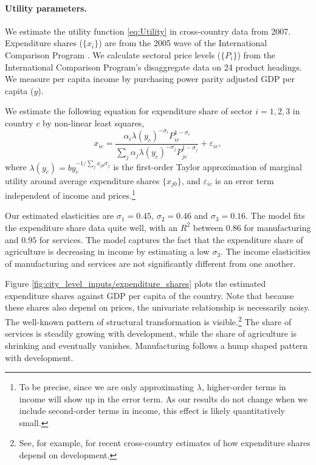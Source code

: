 \documentclass[12pt]{article}
\begin{document}
\paragraph{Utility parameters.}
We estimate the utility function \eqref{eq:Utility} in cross-country data from 2007. Expenditure shares ($\{x_i\}$) are from the 2005 wave of the International Comparison Program \cite{icp}. We calculate sectoral price levels ($\{P_i\}$) from the International Comparison Program's disaggregate data on 24 product headings. We measure per capita income by purchasing power parity adjusted GDP per capita ($y$).

We estimate the following equation for expenditure share of sector $i=1,2,3$ in country $c$ by non-linear least squares,
\begin{equation}\label{eq:estimable:utility}
	x_{ic} =
	\frac 	{\alpha_i \lambda(y_c)^{-\sigma_i}  P_{ic}^{1-\sigma_i}}
			{\sum_j {\alpha_j \lambda(y_c)^{-\sigma_j}  P_{jc}^{1-\sigma_j}}}
	+ \varepsilon_{ic},
\end{equation}
where $\lambda(y_c) = by_c^{-1/\sum_j x_{j0}\sigma_j}$ is the first-order Taylor approximation of marginal utility around average expenditure shares $\{x_{j0}\}$, and $\varepsilon_{ic}$ is an error term independent of income and prices.\footnote{To be precise, since we are only approximating $\lambda$, higher-order terms in income will show up in the error term. As our results do not change when we include second-order terms in income, this effect is likely quantitatively small.}

Our estimated elasticities are $\sigma_1=0.45$, $\sigma_2=0.46$ and $\sigma_3=0.16$. The model fits the expenditure share data quite well, with an $R^2$ between $0.86$ for manufacturing and $0.95$ for services. The model captures the fact that the expenditure share of agriculture is decreasing in income by estimating a low $\sigma_3$. The income elasticities of manufacturing and services are not significantly different from one another. 

Figure \ref{fig:city_level_inputs/expenditure_shares} plots the estimated expenditure shares against GDP per capita of the country. Note that because these shares also depend on prices, the univariate relationship is necessarily noisy. The well-known pattern of structural transformation is visible.\footnote{See, for example,  for recent cross-country estimates of how expenditure shares depend on development.} The share of services is steadily growing with development, while the share of agriculture is shrinking and eventually vanishes. Manufacturing follows a hump shaped pattern with development.
\end{document}
